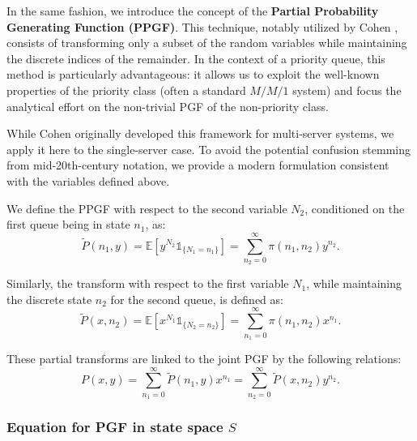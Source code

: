In the same fashion, we introduce the concept of the \textbf{Partial Probability Generating Function (PPGF)}. This technique, notably utilized by Cohen \cite{cohen1956delay}, consists of transforming only a subset of the random variables while maintaining the discrete indices of the remainder. In the context of a priority queue, this method is particularly advantageous: it allows us to exploit the well-known properties of the priority class (often a standard $M/M/1$ system) and focus the analytical effort on the non-trivial PGF of the non-priority class.

While Cohen originally developed this framework for multi-server systems, we apply it here to the single-server case. To avoid the potential confusion stemming from mid-20th-century notation, we provide a modern formulation consistent with the variables defined above.

We define the PPGF with respect to the second variable $N_2$, conditioned on the first queue being in state $n_1$, as:
\begin{equation}
    \widetilde{P}(n_1, y) = \mathbb{E} \left[y^{N_2} \mathbb{1}_{\{ N_1=n_1\}} \right] = \sum_{n_2=0}^{\infty} \pi(n_1,n_2) y^{n_2}.
    \label{eq:gen:ppgf_n1}
\end{equation}

Similarly, the transform with respect to the first variable $N_1$, while maintaining the discrete state $n_2$ for the second queue, is defined as:
\begin{equation}
    \widetilde{P}(x, n_2) = \mathbb{E} \left[x^{N_1} \mathbb{1}_{\{ N_2=n_2\}} \right] = \sum_{n_1=0}^{\infty} \pi(n_1,n_2) x^{n_1}.
\end{equation}

These partial transforms are linked to the joint PGF by the following relations:
\begin{equation}
    P(x,y) = \sum_{n_1=0}^{\infty} \widetilde{P}(n_1, y) x^{n_1} = \sum_{n_2=0}^{\infty} \widetilde{P}(x, n_2) y^{n_2}.
\end{equation}


\subsubsection{Equation for PGF in state space \texorpdfstring{$S$}{S}}

